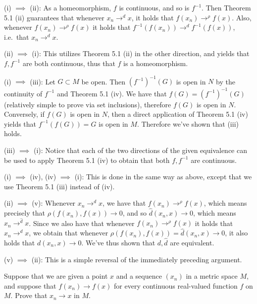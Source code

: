 \begin{solution}

    (i) $\implies$ (ii): As a homeomorphism, $f$ is continuous, and so is $f^{-1}$.
    Then Theorem 5.1 (ii) guarantees that whenever $x_n \rightarrow^{d} x$, it holds that $f(x_n) \rightarrow^{\rho} f(x)$.
    Also, whenever $f(x_n) \rightarrow^{\rho} f(x)$ it holds that $f^{-1}(f(x_n)) \rightarrow^{d} f^{-1}(f(x))$, i.e.\ that $x_n \rightarrow^{d} x$.

    (ii) $\implies$ (i): This utilizes Theorem 5.1 (ii) in the other direction, and yields that $f, f^{-1}$ are both continuous, thus that $f$ is a homeomorphism.

    (i) $\implies$ (iii): Let $G \subset M$ be open.
    Then $(f^{-1})^{-1}(G)$ is open in $N$ by the continuity of $f^{-1}$ and Theorem 5.1 (iv).
    We have that $f(G) = (f^{-1})^{-1}(G)$ (relatively simple to prove via set inclusions), therefore $f(G)$ is open in $N$.
    Conversely, if $f(G)$ is open in $N$, then a direct application of Theorem 5.1 (iv) yields that $f^{-1}(f(G)) = G$ is open in $M$.
    Therefore we've shown that (iii) holds.

    (iii) $\implies$ (i): Notice that each of the two directions of the given equivalence can be used to apply Theorem 5.1 (iv) to obtain that both $f, f^{-1}$ are continuous.

    (i) $\implies$ (iv), (iv) $\implies$ (i): This is done in the same way as above, except that we use Theorem 5.1 (iii) instead of (iv).

    (ii) $\implies$ (v): Whenever $x_n \rightarrow^{d} x$, we have that $f(x_n) \rightarrow^{\rho} f(x)$, which means precisely that $\rho(f(x_n), f(x)) \rightarrow 0$, and so $\hat{d}(x_n, x) \rightarrow 0$, which means $x_n \rightarrow^{\hat{d}} x$.
    Since we also have that whenever $f(x_n) \rightarrow^{\rho} f(x)$ it holds that $x_n \rightarrow^{d} x$, we obtain that whenever $\rho(f(x_n), f(x)) =\hat{d}(x_n, x)\rightarrow 0$, it also holds that $d(x_n, x) \rightarrow 0$.
    We've thus shown that $d, \hat{d}$ are equivalent.
    
    (v) $\implies$ (ii): This is a simple reversal of the immediately preceding argument.
\end{solution}

\begin{exercise}{53}
    Suppose that we are given a point $x$ and a sequence $(x_n)$ in a metric space $M$, and suppose that $f(x_n) \rightarrow f(x)$ for every continuous real-valued function $f$ on $M$.
    Prove that $x_n \rightarrow x$ in $M$.
\end{exercise}

